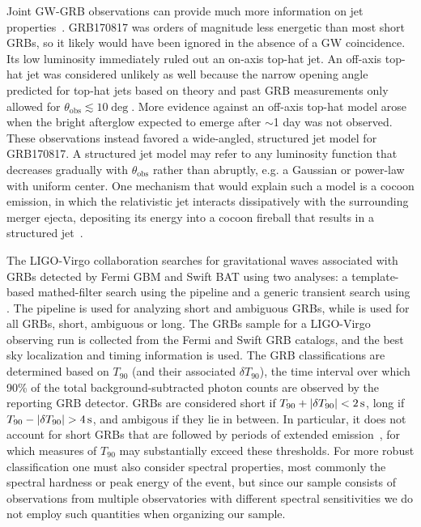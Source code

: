 Joint GW-GRB observations can provide much more information on jet properties~\citep{Mogushi_2019, Farah_2020}.
GRB170817 was orders of magnitude less energetic than most short \acp{GRB}, so it likely would have been ignored in the absence of a \ac{GW} coincidence.
Its low luminosity immediately ruled out an on-axis top-hat jet.
An off-axis top-hat jet was considered unlikely as well because the narrow opening angle predicted for top-hat jets based on theory and past \ac{GRB} measurements only allowed for $\theta_{\mathrm{obs}} \lesssim 10\deg$.
More evidence against an off-axis top-hat model arose when the bright afterglow expected to emerge after $\sim$1 day was not observed.
These observations instead favored a wide-angled, structured jet model for GRB170817.
A structured jet model may refer to any luminosity function that decreases gradually with $\theta_{\mathrm{obs}}$ rather than abruptly, e.g. a Gaussian or power-law with uniform center.
One mechanism that would explain such a model is a cocoon emission, in which the relativistic jet interacts dissipatively with the surrounding merger ejecta, depositing its energy into a cocoon fireball that results in a structured jet~\citep{gw170817_grb}.

The \ac{LIGO}-Virgo collaboration searches for gravitational waves associated with \acp{GRB} detected by Fermi \ac{GBM} and Swift \ac{BAT} using two analyses: a template-based mathed-filter search using the \pygrb pipeline and a generic transient search using \xpip.
The \pygrb pipeline is used for analyzing short and ambiguous \acp{GRB}, while \xpip is used for all \acp{GRB}, short, ambiguous or long.
The \acp{GRB} sample for a LIGO-Virgo observing run is collected from the Fermi and Swift \ac{GRB} catalogs, and the best sky localization and timing information is used.
The \ac{GRB} classifications are determined based on $T_{90}$ (and their associated $\delta T_{90}$), the time interval over which 90\% of the total background-subtracted photon counts are observed by the reporting \ac{GRB} detector.
\Acp{GRB} are considered short if $T_{90} + \abs{\delta T_{90}} < 2\,\text{s}$, long if $T_{90} - \abs{\delta T_{90}} > 4\,\text{s}$, and ambigous if they lie in between.
In particular, it does not account for short GRBs that are followed by periods of extended emission~\citep{Norris_2006, vanPutten_2014}, for which measures of $T_{90}$ may substantially exceed these thresholds.
For more robust classification one must also consider spectral properties, most commonly the spectral hardness or peak energy of the event, but since our sample consists of observations from multiple observatories with different spectral sensitivities we do not employ such quantities when organizing our sample.

